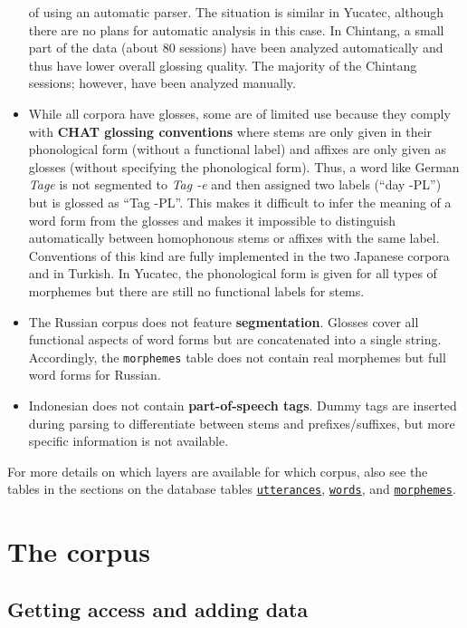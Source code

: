 \documentclass[a4paper, 11pt]{book}
\begin{document}
\begin{itemize}
		of using an automatic parser. The situation is similar in Yucatec, although there are no plans for automatic analysis in this case.  
		In Chintang, a small part of the data (about 80 sessions) have been analyzed automatically and thus have lower overall glossing quality. The majority
		of the Chintang sessions; however, have been analyzed manually.
	\item While all corpora have glosses, some are of limited use because they comply with \textbf{CHAT glossing conventions} where stems are only given
		in their phonological form (without a functional label) and affixes are only given as glosses (without specifying the phonological form). 
		Thus, a word like German \emph{Tage} is not segmented to \emph{Tag -e} and then assigned two labels (“day -PL”) but is glossed as “Tag -PL”. 
		This makes it difficult to infer the meaning of a word form from the glosses and makes it impossible to distinguish automatically between 
		homophonous stems or affixes with the same label. Conventions of this kind are fully implemented in the two Japanese corpora and in Turkish. 
		In Yucatec, the phonological form is given for all types of morphemes but there are still no functional labels for stems. 
	\item The Russian corpus does not feature \textbf{segmentation}. Glosses cover all functional aspects of word forms but are concatenated into a
		single string. Accordingly, the \texttt{morphemes} table does not contain real morphemes but full word forms for Russian. 	 
	\item Indonesian does not contain \textbf{part-of-speech tags}. Dummy tags are inserted during parsing to differentiate between stems and prefixes/suffixes, 
		but more specific information is not available. 
\end{itemize}

For more details on which layers are available for which corpus, also see the tables in the sections on the database tables \hyperref[subsec:Table utterances]{\texttt{utterances}}, \hyperref[subsec:Table words]{\texttt{words}}, and \hyperref[subsec:Table morphemes]{\texttt{morphemes}}. 


\chapter{The corpus}
\label{cha:Details of the corpus}

\section{Getting access and adding data}
\label{sec:Access to the corpus}
\end{document}
